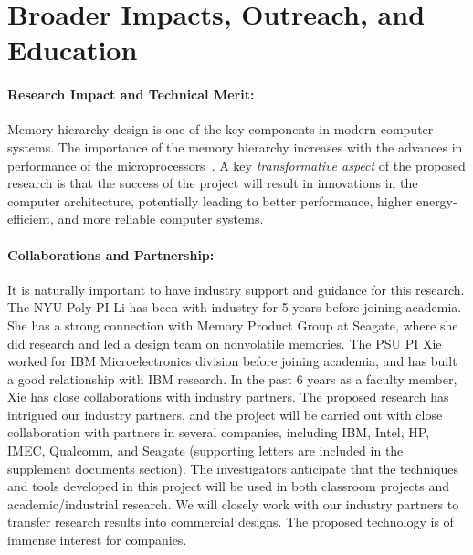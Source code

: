 
\section{Broader Impacts, Outreach, and Education}

\paragraph{\textbf{Research Impact and Technical Merit:}}
Memory hierarchy design is one of the key components in modern computer
systems. The importance of the memory hierarchy
increases with the advances in performance of the
microprocessors~\cite{ITRS07}.  A key \textit{transformative aspect} of the proposed research is
that the success of the project will result in innovations in the computer architecture,
potentially leading to better performance, higher energy-efficient, and more reliable
computer systems.


\paragraph{\textbf{Collaborations and Partnership:}} It is naturally important to have industry support and guidance for this research.  The NYU-Poly PI Li has been with industry for 5 years before joining academia.  She has a strong connection with Memory
Product Group at Seagate, where she did research and led a design team on nonvolatile memories.    The PSU PI Xie worked for IBM Microelectronics division
before joining academia, and has built a good relationship with IBM
research. In the past 6 years as a faculty member, Xie has close collaborations with industry
partners. The proposed research has intrigued our industry partners, and the project will be
carried out with close collaboration with partners in several
companies, including IBM, Intel, HP, IMEC, Qualcomm, and Seagate (supporting letters are included
in the supplement documents section).
The investigators
anticipate that the techniques and tools developed in this project will be
used in both classroom projects and academic/industrial
research. We will closely work with our industry partners to
transfer research results into commercial designs. The proposed
technology is of immense interest for companies.


